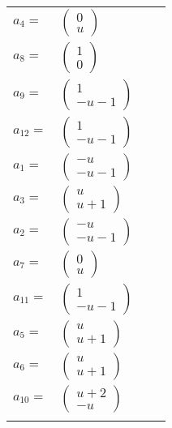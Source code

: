 \documentclass[1p]{elsarticle_modified}
\theoremstyle{definition}
\begin{document}
\begin{tabular}{m{7pt} m{180pt} m{7pt} m{180pt} }
\flushright $a_{4}=$&$\begin{pmatrix}0\\u\end{pmatrix}$ \\
\flushright $a_{8}=$&$\begin{pmatrix}1\\0\end{pmatrix}$ \\
\flushright $a_{9}=$&$\begin{pmatrix}1\\- u-1\end{pmatrix}$ \\
\flushright $a_{12}=$&$\begin{pmatrix}1\\- u-1\end{pmatrix}$ \\
\flushright $a_{1}=$&$\begin{pmatrix}- u\\- u-1\end{pmatrix}$ \\
\flushright $a_{3}=$&$\begin{pmatrix}u\\u+1\end{pmatrix}$ \\
\flushright $a_{2}=$&$\begin{pmatrix}- u\\- u-1\end{pmatrix}$ \\
\flushright $a_{7}=$&$\begin{pmatrix}0\\u\end{pmatrix}$ \\
\flushright $a_{11}=$&$\begin{pmatrix}1\\- u-1\end{pmatrix}$ \\
\flushright $a_{5}=$&$\begin{pmatrix}u\\u+1\end{pmatrix}$ \\
\flushright $a_{6}=$&$\begin{pmatrix}u\\u+1\end{pmatrix}$ \\
\flushright $a_{10}=$&$\begin{pmatrix}u+2\\- u\end{pmatrix}$\\&\end{tabular}
\end{document}
